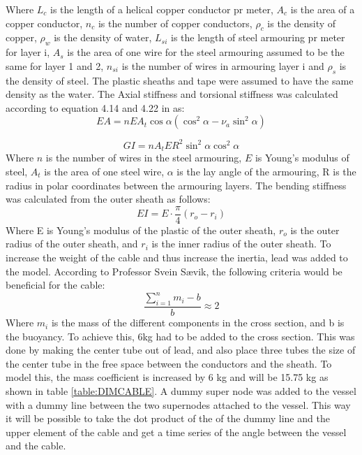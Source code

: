 \noindent Where $L_c$ is the length of a helical copper conductor pr meter, $A_c$ is the area of a copper conductor, $n_c$ is the number of copper conductors, $\rho_c$ is the density of copper, $\rho_w$ is the density of water, $L_{si}$ is the length of steel armouring pr meter for layer i, $A_s$ is the area of one wire for the steel armouring assumed to be the same for layer 1 and 2, $n_{si}$ is the number of wires in armouring layer i and $\rho_s$ is the density of steel. The plastic sheaths and tape were assumed to have the same density as the water. \newline
\newline 
The Axial stiffness and torsional stiffness was calculated according to equation 4.14 and 4.22 in \cite{Savik2016} as:
\begin{equation}
    EA=nEA_t \cos\alpha(\cos^2\alpha-\nu_a \sin^2\alpha)
\end{equation}

\begin{equation}
    GI=nA_t E R^2 \sin^2 \alpha \cos^2 \alpha
\end{equation}
Where $n$ is the number of wires in the steel armouring, $E$ is Young's modulus of steel, $A_t$ is the area of one steel wire, $\alpha$ is the lay angle of the armouring, R is the radius in polar coordinates between the armouring layers.  \newline
\newline 
The bending stiffness was calculated from the outer sheath as follows:
\begin{equation}
    EI= E\cdot \frac{\pi}{4}(r_o-r_i)
\end{equation}
Where E is Young's modulus of the plastic of the outer sheath, $r_o$ is the outer radius of the outer sheath, and $r_i$ is the inner radius of the outer sheath. \newline
\newline 
To increase the weight of the cable and thus increase the inertia, lead was added to the model. According to Professor Svein Sævik, the following criteria would be beneficial for the cable:
\begin{equation}
    \frac{\sum_{i=1}^n m_i - b}{b}\approx 2
\end{equation}
Where $m_i$ is the mass of the different components in the cross section, and b is the buoyancy. To achieve this, 6kg had to be added to the cross section. This was done by making the center tube out of lead, and also place three tubes the size of the center tube in the free space between the conductors and the sheath. To model this, the mass coefficient is increased by 6 kg and will be 15.75 kg as shown in table \ref{table:DIMCABLE}. \newline
\newline A dummy super node was added to the vessel with a dummy line between the two supernodes attached to the vessel. This way it will be possible to take the dot product of the of the dummy line and the upper element of the cable and get a time series of the angle between the vessel and the cable.
